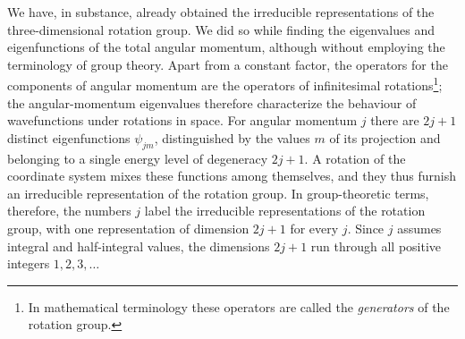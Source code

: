 We have, in substance, already obtained the irreducible representations of the three-dimensional rotation group. We did so while finding the eigenvalues and eigenfunctions of the total angular momentum, although without employing the terminology of group theory. Apart from a constant factor, the operators for the components of angular momentum are the operators of infinitesimal rotations\footnote{In mathematical terminology these operators are called the \emph{generators} of the rotation group.}; the angular-momentum eigenvalues therefore characterize the behaviour of wavefunctions under rotations in space. For angular momentum $j$ there are $2j+1$ distinct eigenfunctions $\psi_{jm}$, distinguished by the values $m$ of its projection and belonging to a single energy level of degeneracy $2j+1$. A rotation of the coordinate system mixes these functions among themselves, and they thus furnish an irreducible representation of the rotation group. In group-theoretic terms, therefore, the numbers $j$ label the irreducible representations of the rotation group, with one representation of dimension $2j+1$ for every $j$. Since $j$ assumes integral and half-integral values, the dimensions $2j+1$ run through all positive integers $1,2,3,\ldots$
